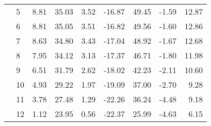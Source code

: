 \begin{table}
\begin{tabular}{l|l|rrrrrrr}
 & 5 & 8.81 & 35.03 & 3.52 & -16.87 & 49.45 & -1.59 & 12.87 \\
 & 6 & 8.81 & 35.05 & 3.51 & -16.82 & 49.56 & -1.60 & 12.86 \\
 & 7 & 8.63 & 34.80 & 3.43 & -17.04 & 48.92 & -1.67 & 12.68 \\
 & 8 & 7.95 & 34.12 & 3.13 & -17.37 & 46.71 & -1.80 & 11.98 \\
 & 9 & 6.51 & 31.79 & 2.62 & -18.02 & 42.23 & -2.11 & 10.60 \\
 & 10 & 4.93 & 29.22 & 1.97 & -19.09 & 37.00 & -2.70 & 9.28 \\
 & 11 & 3.78 & 27.48 & 1.29 & -22.26 & 36.24 & -4.48 & 9.18 \\
 & 12 & 1.12 & 23.95 & 0.56 & -22.37 & 25.99 & -4.63 & 6.15 \\
\cline{1-9}
\bottomrule
\end{tabular}
\end{table}
